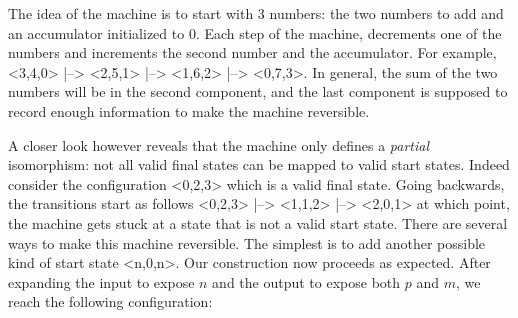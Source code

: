 \documentclass{llncs}
\begin{document}
{The idea of the machine is to start with 3 numbers: the two numbers to add
and an accumulator initialized to 0. Each step of the machine, decrements one
of the numbers and increments the second number and the accumulator. For
example, {{<3,4,0> |--> <2,5,1> |--> <1,6,2> |--> <0,7,3>}}. In general, the
sum of the two numbers will be in the second component, and the last
component is supposed to record enough information to make the machine
reversible.

A closer look however reveals that the machine only defines a \emph{partial}
isomorphism: not all valid final states can be mapped to valid start
states. Indeed consider the configuration {{<0,2,3>}} which is a valid final
state. Going backwards, the transitions start as follows
{{<0,2,3> |--> <1,1,2> |--> <2,0,1>}} at which point, the machine 
gets stuck at a state that is not a valid start state. 
There are several ways to make this machine reversible. The simplest is to
add another possible kind of start state {{<n,0,n>}}. Our construction now
proceeds as expected. After expanding the input to expose $n$ and the output
to expose both $p$ and $m$, we reach the following configuration:





%

}
\end{document}
